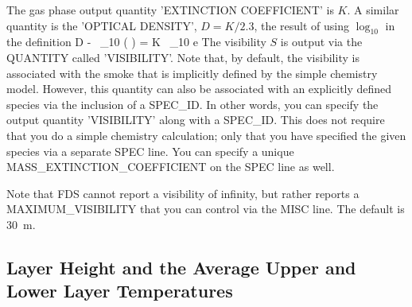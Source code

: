\documentclass[11pt]{book}
\begin{document}
The gas phase output quantity {\ct 'EXTINCTION COEFFICIENT'} is $K$. A similar quantity is the
{\ct 'OPTICAL DENSITY'}, $D=K/2.3$, the result of using $\log_{10}$ in the definition
\be D \equiv -  \, \log_{10} \left(  \right) = K \, \log_{10} {\rm e}   \ee
The visibility $S$ is output via the {\ct QUANTITY} called {\ct 'VISIBILITY'}. Note
that, by default, the visibility is associated with the smoke that is implicitly defined by the simple chemistry
model. However, this quantity can also be associated with an
explicitly defined species via the inclusion of a {\ct SPEC\_ID}.
In other words, you can specify the output quantity {\ct 'VISIBILITY'} along with a {\ct SPEC\_ID}.
This does not require that you do a simple chemistry calculation; only that you have specified the given species via a separate
{\ct SPEC} line. You can
specify a unique {\ct MASS\_EXTINCTION\_COEFFICIENT} on the {\ct SPEC} line as well.

Note that FDS cannot report a visibility of infinity, but rather reports a {\ct MAXIMUM\_VISIBILITY} that you can control via the
{\ct MISC} line. The default is 30~m.


\subsection{Layer Height and the Average Upper and Lower Layer Temperatures}
\label{info:layerheight}
\end{document}
